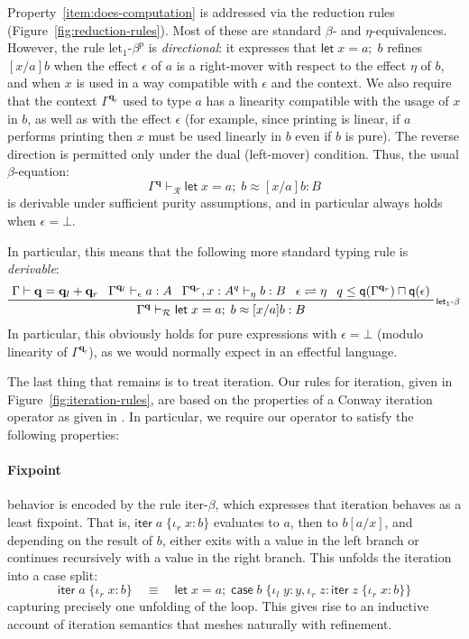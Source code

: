 \documentclass[acmsmall,screen,review]{acmart}
\newcommand{\mc}[1]{\ensuremath{\mathcal{#1}}}
\newcommand{\mb}[1]{\ensuremath{\mathbf{#1}}}
\newcommand{\ms}[1]{\ensuremath{\mathsf{#1}}}
\newcommand{\lto}{:}
\newcommand{\linl}[1]{\iota_l\;{#1}}
\newcommand{\linr}[1]{\iota_r\;{#1}}
\newcommand{\letexpr}[3]{\ensuremath{\ms{let}\;#1 = #2;\;#3}}
\newcommand{\caseexpr}[5]{\ms{case}\;#1\;\{\linl{#2} \lto #3, \linr{#4} \lto #5\}}
\newcommand{\liter}[3]{\ms{iter}\;#1\;\{ \linr{#2} \lto #3 \}}
\newcommand{\qsp}[4]{#1 \vdash #2 = #3 + #4}
\newcommand{\rle}[1]{{\scriptsize\textsf{#1}}}
\newcommand{\hasty}[4]{#1 \vdash_{#2} #3: {#4}}
\newcommand{\teqv}{\approx}
\newcommand{\tmeq}[5]{#1 \vdash_{#2} #3 \teqv #4 : {#5}}
\newcommand{\slides}{\rightleftharpoons}
\newcommand{\alquant}{\ms{q}}
\begin{document}
Property~\ref{item:does-computation} is addressed via the reduction rules
(Figure~\ref{fig:reduction-rules}). Most of these are standard $\beta$- and $\eta$-equivalences.
However, the rule \textsf{let$_1$-$\beta^p$} is \emph{directional}: it expresses that
$\letexpr{x}{a}{b}$ refines $[x/a]b$ when the effect $\epsilon$ of $a$ is a right-mover with respect
to the effect $\eta$ of $b$, and when $x$ is used in a way compatible with $\epsilon$ and the
context. We also require that the context $\Gamma^{\mb{q}_r}$ used to type $a$ has a linearity
compatible with the usage of $x$ in $b$, as well as with the effect $\epsilon$ (for example, since
printing is linear, if $a$ performs printing then $x$ must be used linearly in $b$ even if $b$ is
pure). The reverse direction is permitted only under the dual (left-mover) condition. Thus, the
usual $\beta$-equation:
\[
\tmeq{\Gamma^{\mb{q}}}{\mc{R}}{\letexpr{x}{a}{b}}{[x/a]b}{B}
\]
is derivable under sufficient purity assumptions, and in particular always holds when $\epsilon =
\bot$.

In particular, this means that the following more standard typing rule is \emph{derivable}:
\begin{equation}
  \prftree[r]{\rle{let$_1$-$\beta$}}
  {\qsp{\Gamma}{\mb{q}}{\mb{q}_l}{\mb{q}_r}}
  {\hasty{\Gamma^{\mb{q}_l}}{\epsilon}{a}{A}}
  {\hasty{\Gamma^{\mb{q}_r}, x : A^q}{\eta}{b}{B}}
  {\epsilon \slides \eta}
  {q \leq \alquant(\Gamma^{\mb{q}_r}) \sqcap \alquant(\epsilon)}
  {
    \tmeq{\Gamma^{\mb{q}}}{\mc{R}}{\letexpr{x}{a}{b}}{[x/a]b}{B}
  }
\end{equation}
In particular, this obviously holds for pure expressions with $\epsilon = \bot$ (modulo linearity of
$\Gamma^{\mb{q}_r}$), as we would normally expect in an effectful language.

The last thing that remains is to treat iteration. Our rules for iteration, given in
Figure~\ref{fig:iteration-rules}, are based on the properties of a Conway iteration operator as
given in \citet{coinductive-resumption-levy-goncharov-19}. In particular, we require our operator to
satisfy the following properties:
%
\paragraph{Fixpoint} behavior is encoded by the rule \textsf{iter-$\beta$}, which expresses that
iteration behaves as a least fixpoint. That is, $\liter{a}{x}{b}$ evaluates to $a$, then to
$b[a/x]$, and depending on the result of $b$, either exits with a value in the left branch or
continues recursively with a value in the right branch. This unfolds the iteration into a case
split:
\[
\liter{a}{x}{b} \quad \equiv \quad \letexpr{x}{a}{\caseexpr{b}{y}{y}{z}{\liter{z}{x}{b}}}
\]
capturing precisely one unfolding of the loop. This gives rise to an inductive account of iteration
semantics that meshes naturally with refinement.
%
\end{document}
